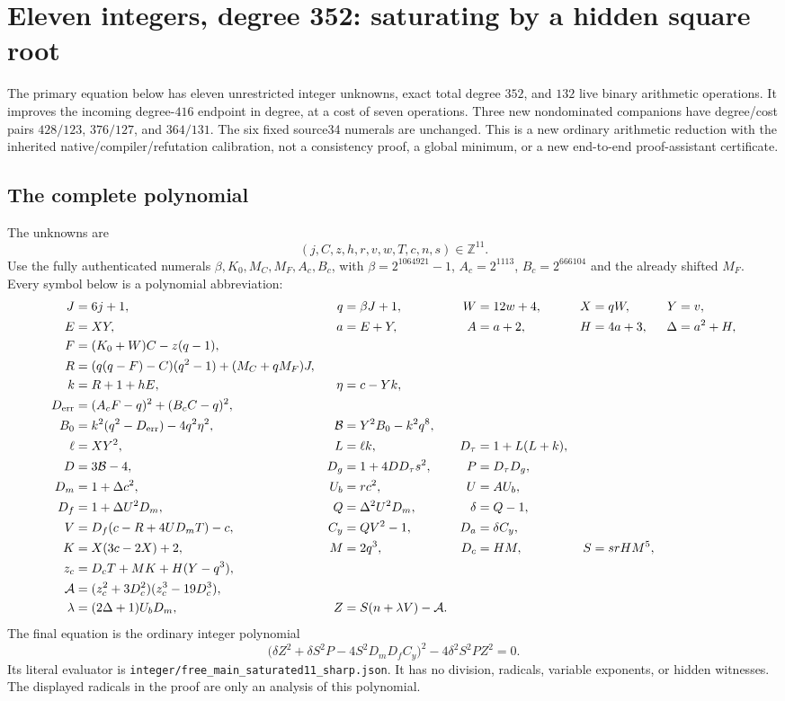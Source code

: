\section{Eleven integers, degree 352: saturating by a hidden square root}
\label{sec:integer352}
The primary equation below has eleven unrestricted integer unknowns, exact
total degree $352$, and $132$ live binary arithmetic operations. It improves
the incoming degree-$416$ endpoint in degree, at a cost of seven operations.
Three new nondominated companions have degree/cost pairs
$428/123$, $376/127$, and $364/131$. The six fixed source34 numerals are
unchanged. This is a new ordinary arithmetic reduction with the inherited
native/compiler/refutation calibration, not a consistency proof, a global
minimum, or a new end-to-end proof-assistant certificate.

\subsection{The complete polynomial}
The unknowns are
\[
 (j,C,z,h,r,v,w,T,c,n,s)\in\mathbb Z^{11}.
\]
Use the fully authenticated numerals
$\beta,K_0,M_C,M_F,A_c,B_c$, with
$\beta=2^{1064921}-1$, $A_c=2^{1113}$, $B_c=2^{666104}$ and the already
shifted $M_F$. Every symbol below is a polynomial abbreviation:
\begin{align*}
 J&=6j+1,&q&=\beta J+1,&W&=12w+4,&X&=qW,&Y&=v,\\
 E&=XY,&a&=E+Y,&A&=a+2,&H&=4a+3,&\Delta&=a^2+H,\\
 F&=(K_0+W)C-z(q-1),\\
 R&=(q(q-F)-C)(q^2-1)+(M_C+qM_F)J,\\
 k&=R+1+hE,&\eta&=c-Yk,\\
 D_{\rm err}&=(A_cF-q)^2+(B_cC-q)^2,\\
 B_0&=k^2(q^2-D_{\rm err})-4q^2\eta^2,&
 \mathcal B&=Y^2B_0-k^2q^8,\\
 \ell&=XY^2,&L&=\ell k,&D_\tau&=1+L(L+k),\\
 D&=3\mathcal B-4,&D_g&=1+4DD_\tau s^2,&P&=D_\tau D_g,\\
 D_m&=1+\Delta c^2,&U_b&=rc^2,&U&=AU_b,\\
 D_f&=1+\Delta U^2D_m,&Q&=\Delta^2U^2D_m,&\delta&=Q-1,\\
 V&=D_f(c-R+4UD_mT)-c,&C_y&=QV^2-1,&D_a&=\delta C_y,\\
 K&=X(3c-2X)+2,&M&=2q^3,&D_c&=HM,&S&=srHM^5,\\
 z_c&=D_cT+MK+H(Y-q^3),\\
 \mathcal A&=(z_c^2+3D_c^2)(z_c^3-19D_c^3),\\
 \lambda&=(2\Delta+1)U_bD_m,&Z&=S(n+\lambda V)-\mathcal A.
\end{align*}
The final equation is the ordinary integer polynomial
\begin{equation}\label{eq:integer352}
 \boxed{\bigl(\delta Z^2+\delta S^2P-4S^2D_mD_fC_y\bigr)^2
             -4\delta^2S^2PZ^2=0.}
\end{equation}
Its literal evaluator is
\texttt{integer/free\_main\_saturated11\_sharp.json}.
It has no division, radicals, variable exponents, or hidden witnesses.
The displayed radicals in the proof are only an analysis of this polynomial.

